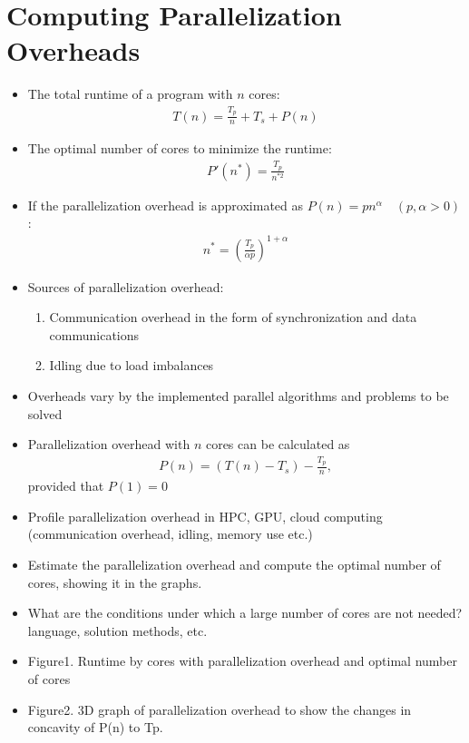\documentclass[12pt]{article}
\begin{document}
\clearpage
\section{Computing Parallelization Overheads}
\begin{itemize}
\item The total runtime of a program with $n$ cores:
\begin{align*}
T(n) = \frac{T_p}{n} + T_s + P(n)
\end{align*}
\item The optimal number of cores to minimize the runtime:
\begin{align*}
P'(n^*) = \frac{T_p}{n^{*2}} 
\end{align*}
\item If the parallelization overhead is approximated as $P(n)=pn^\alpha \quad (p,\alpha>0)$:
\begin{align*}
n^* = \left(\frac{T_p}{\alpha p} \right)^{1+\alpha}
\end{align*}
\item Sources of parallelization overhead:
\begin{enumerate}
\item Communication overhead in the form of synchronization and data communications
\item Idling due to load imbalances
\end{enumerate}
\item Overheads vary by the implemented parallel algorithms and problems to be solved 
\item Parallelization overhead with $n$ cores can be calculated as
\begin{align*}
P(n) = (T(n)-T_s) - \frac{T_p}{n},
\end{align*}
provided that $P(1)=0$
\end{itemize}



\begin{itemize}
\item Profile parallelization overhead in HPC, GPU, cloud computing (communication overhead, idling, memory use etc.)
\item Estimate the parallelization overhead and compute the optimal number of cores, showing it in the graphs.
\item What are the conditions under which a large number of cores are not needed? language, solution methods, etc.
\end{itemize}

\begin{itemize}
\item Figure1. Runtime by cores with parallelization overhead and optimal number of cores
\item Figure2. 3D graph of parallelization overhead to show the changes in concavity of P(n) to Tp.
\end{itemize}
\end{document}
